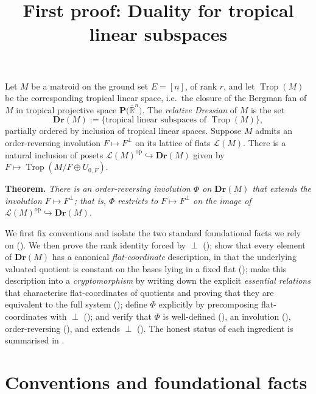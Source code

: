 \documentclass{article}
\title{First proof: Duality for tropical linear subspaces}
\author{}
\date{}
\theoremstyle{definition}
\newcommand{\Rbar}{\overline{\mathbb{R}}}
\newcommand{\Trop}{\operatorname{Trop}}
\newcommand{\op}{\operatorname{op}}
\newcommand{\into}{\hookrightarrow}
\newcommand{\Dr}{\mathbf{Dr}}
\newcommand{\cLL}{\mathcal{L}}
\newcommand{\PT}[1]{\mathbf{P}\big(\Rbar^{#1}\big)}
\begin{document}
\maketitle

\noindent
Let $M$ be a matroid on the ground set $E=[n]$, of rank $r$, and let $\Trop(M)$ be the
corresponding tropical linear space, i.e.\ the closure of the Bergman fan of $M$ in tropical
projective space $\PT{n}$. The \emph{relative Dressian} of $M$ is the set
\[
  \Dr(M):=\{\text{tropical linear subspaces of }\Trop(M)\},
\]
partially ordered by inclusion of tropical linear spaces. Suppose $M$ admits an order-reversing
involution $F\mapsto F^{\perp}$ on its lattice of flats $\cLL(M)$. There is a natural inclusion of
posets $\cLL(M)^{\op}\into\Dr(M)$ given by $F\mapsto\Trop(M/F\oplus U_{0,F})$.

\medskip
\noindent\textbf{Theorem.} \emph{There is an order-reversing involution $\Phi$ on $\Dr(M)$ that
extends the involution $F\mapsto F^{\perp}$; that is, $\Phi$ restricts to $F\mapsto F^{\perp}$ on the
image of $\cLL(M)^{\op}\into\Dr(M)$.}

\medskip

We first fix conventions and isolate the two standard foundational facts we rely on
(). We then prove the rank identity forced by $\perp$ (); show that
every element of $\Dr(M)$ has a canonical \emph{flat-coordinate} description, in that the underlying
valuated quotient is constant on the bases lying in a fixed flat (); make this
description into a \emph{cryptomorphism} by writing down the explicit \emph{essential relations} that
characterise flat-coordinates of quotients and proving that they are equivalent to the full system
(); define $\Phi$ explicitly by precomposing flat-coordinates with
$\perp$ (); and verify that $\Phi$ is well-defined (), an involution
(), order-reversing (), and extends $\perp$ (). The
honest status of each ingredient is summarised in .

\section{Conventions and foundational facts}\label{ssec:found}
\end{document}
